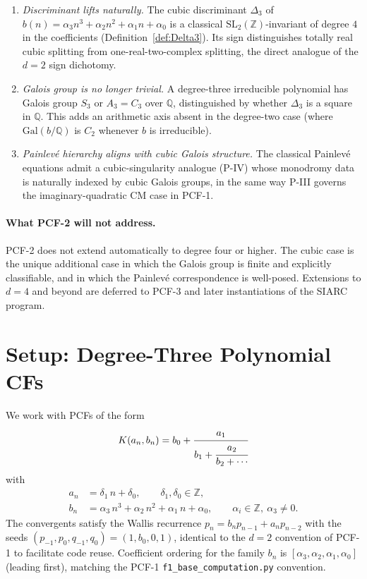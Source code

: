 \documentclass[11pt,a4paper]{article}
\theoremstyle{definition}
\theoremstyle{remark}
\newcommand{\Q}{\mathbb{Q}}
\newcommand{\Z}{\mathbb{Z}}
\newcommand{\Gal}{\mathrm{Gal}}
\begin{document}
\begin{enumerate}
\item \emph{Discriminant lifts naturally.} The cubic discriminant
$\Delta_{3}$ of $b(n)=\alpha_{3}n^{3}+\alpha_{2}n^{2}+\alpha_{1}n+\alpha_{0}$
is a classical $\mathrm{SL}_{2}(\Z)$-invariant of degree $4$ in the
coefficients (Definition~\ref{def:Delta3}). Its sign distinguishes
totally real cubic splitting from one-real-two-complex splitting, the
direct analogue of the $d=2$ sign dichotomy.
\item \emph{Galois group is no longer trivial.} A degree-three irreducible
polynomial has Galois group $S_{3}$ or $A_{3}=C_{3}$ over $\Q$,
distinguished by whether $\Delta_{3}$ is a square in $\Q$. This adds an
arithmetic axis absent in the degree-two case (where $\Gal(b/\Q)$ is
$C_{2}$ whenever $b$ is irreducible).
\item \emph{Painlev\'e hierarchy aligns with cubic Galois structure.} The
classical Painlev\'e equations admit a cubic-singularity analogue (P-IV)
whose monodromy data is naturally indexed by cubic Galois groups, in
the same way P-III governs the imaginary-quadratic CM case in PCF-1.
\end{enumerate}

\paragraph{What PCF-2 will not address.}
PCF-2 does not extend automatically to degree four or higher. The cubic
case is the unique additional case in which the Galois group is finite
and explicitly classifiable, and in which the Painlev\'e correspondence
is well-posed. Extensions to $d=4$ and beyond are deferred to PCF-3 and
later instantiations of the SIARC program.

\section{Setup: Degree-Three Polynomial CFs}\label{sec:setup}

We work with PCFs of the form
\begin{equation}\label{eq:pcfd3}
K(a_{n},b_{n})=b_{0}+\cfrac{a_{1}}{b_{1}+\cfrac{a_{2}}{b_{2}+\cdots}}
\end{equation}
with
\begin{align}
a_{n} &= \delta_{1}\,n + \delta_{0},\qquad \delta_{1},\delta_{0}\in\Z, \label{eq:an}\\
b_{n} &= \alpha_{3}\,n^{3} + \alpha_{2}\,n^{2} + \alpha_{1}\,n + \alpha_{0},\qquad \alpha_{i}\in\Z,\ \alpha_{3}\ne 0. \label{eq:bn}
\end{align}
The convergents satisfy the Wallis recurrence $p_{n}=b_{n}p_{n-1}+a_{n}p_{n-2}$
with the seeds $(p_{-1},p_{0},q_{-1},q_{0})=(1,b_{0},0,1)$, identical to
the $d=2$ convention of PCF-1 to facilitate code reuse. Coefficient
ordering for the family $b_{n}$ is $[\alpha_{3},\alpha_{2},\alpha_{1},\alpha_{0}]$
(leading first), matching the PCF-1 \texttt{f1\_base\_computation.py}
convention.
\end{document}
